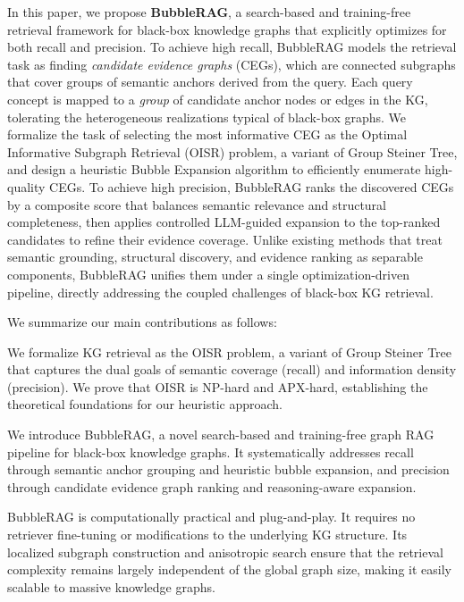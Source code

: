 In this paper, we propose \textbf{BubbleRAG}, a search-based and training-free retrieval framework for black-box knowledge graphs that explicitly optimizes for both recall and precision.
To achieve high recall, BubbleRAG models the retrieval task as finding \emph{candidate evidence graphs} (CEGs), which are connected subgraphs that cover groups of semantic anchors derived from the query. Each query concept is mapped to a \emph{group} of candidate anchor nodes or edges in the KG, tolerating the heterogeneous realizations typical of black-box graphs. We formalize the task of selecting the most informative CEG as the Optimal Informative Subgraph Retrieval (OISR) problem, a variant of Group Steiner Tree, and design a heuristic Bubble Expansion algorithm to efficiently enumerate high-quality CEGs.
To achieve high precision, BubbleRAG ranks the discovered CEGs by a composite score that balances semantic relevance and structural completeness, then applies controlled LLM-guided expansion to the top-ranked candidates to refine their evidence coverage.
Unlike existing methods that treat semantic grounding, structural discovery, and evidence ranking as separable components, BubbleRAG unifies them under a single optimization-driven pipeline, directly addressing the coupled challenges of black-box KG retrieval.

We summarize our main contributions as follows:

 We formalize KG retrieval as the OISR problem, a variant of Group Steiner Tree that captures the dual goals of semantic coverage (recall) and information density (precision). We prove that OISR is NP-hard and APX-hard, establishing the theoretical foundations for our heuristic approach.

 We introduce BubbleRAG, a novel search-based and training-free graph RAG pipeline for black-box knowledge graphs. It systematically addresses recall through semantic anchor grouping and heuristic bubble expansion, and precision through candidate evidence graph ranking and reasoning-aware expansion.

 BubbleRAG is computationally practical and plug-and-play. It requires no retriever fine-tuning or modifications to the underlying KG structure. Its localized subgraph construction and anisotropic search ensure that the retrieval complexity remains largely independent of the global graph size, making it easily scalable to massive knowledge graphs.

